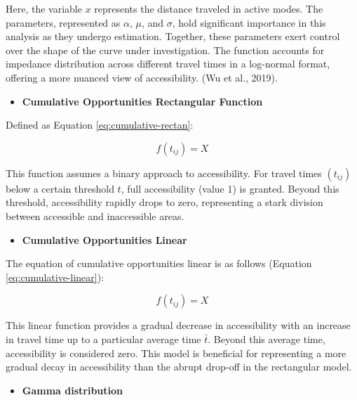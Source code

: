 \documentclass[
11pt, %
oneside, %
english, %
singlespacing, %
]{macthesis} %
\def\tightlist{}
\begin{document}
Here, the variable \(x\) represents the distance traveled in active modes. The parameters, represented as \(\alpha\), \(\mu\), and \(\sigma\), hold significant importance in this analysis as they undergo estimation. Together, these parameters exert control over the shape of the curve under investigation. The function accounts for impedance distribution across different travel times in a log-normal format, offering a more nuanced view of accessibility. (Wu et al., 2019).

\begin{itemize}
\tightlist
\item
  \textbf{Cumulative Opportunities Rectangular Function}
\end{itemize}

Defined as Equation \ref{eq:cumulative-rectan}:

\begin{equation}
f(t_{ij}) = X
\label{eq:cumulative-rectan}
\end{equation}

This function assumes a binary approach to accessibility. For travel times \((t_{ij})\) below a certain threshold \(t\), full accessibility (value 1) is granted. Beyond this threshold, accessibility rapidly drops to zero, representing a stark division between accessible and inaccessible areas.

\begin{itemize}
\tightlist
\item
  \textbf{Cumulative Opportunities Linear}
\end{itemize}

The equation of cumulative opportunities linear is as follows (Equation \ref{eq:cumulative-linear}):

\begin{equation}
f(t_{ij}) = X
\label{eq:cumulative-linear}
\end{equation}

This linear function provides a gradual decrease in accessibility with an increase in travel time up to a particular average time \(\bar{t}\). Beyond this average time, accessibility is considered zero. This model is beneficial for representing a more gradual decay in accessibility than the abrupt drop-off in the rectangular model.

\begin{itemize}
\tightlist
\item
  \textbf{Gamma distribution}
\end{itemize}
\end{document}
